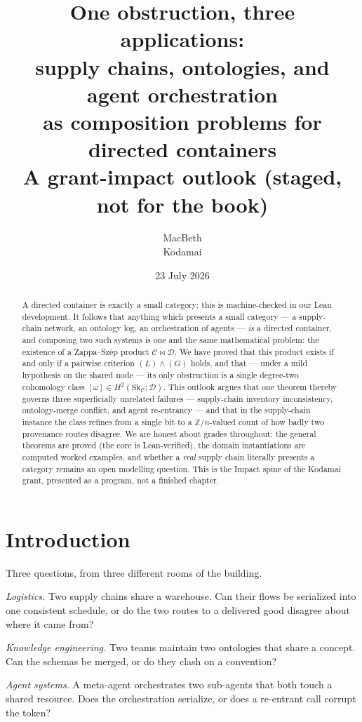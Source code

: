 \documentclass[11pt]{article}
\title{One obstruction, three applications:\\
supply chains, ontologies, and agent orchestration\\
as composition problems for directed containers\\[2pt]
\large A grant-impact outlook (staged, not for the book)}
\author{MacBeth\\\small Kodamai}
\date{23 July 2026}
\theoremstyle{definition}
\newcommand{\C}{\mathcal{C}}
\newcommand{\D}{\mathcal{D}}
\newcommand{\Sk}{\mathrm{Sk}}
\newcommand{\Zn}{\mathbb{Z}/n}
\begin{document}
\maketitle

\begin{abstract}
A directed container is exactly a small category; this is machine-checked in our Lean
development. It follows that anything which presents a small category --- a supply-chain
network, an ontology log, an orchestration of agents --- \emph{is} a directed container,
and composing two such systems is one and the same mathematical problem: the existence
of a Zappa--Sz\'ep product $\C\bowtie\D$. We have proved that this product exists if and
only if a pairwise criterion $(L)\wedge(G)$ holds, and that --- under a mild hypothesis on
the shared node --- its only obstruction is a single degree-two cohomology class
$[\omega]\in H^2(\Sk_\C;\D)$. This outlook argues that
one theorem thereby governs three superficially unrelated failures --- supply-chain
inventory inconsistency, ontology-merge conflict, and agent re-entrancy --- and that in
the supply-chain instance the class refines from a single bit to a $\Zn$-valued count of
how badly two provenance routes disagree. We are honest about grades throughout: the
general theorems are proved (the core is Lean-verified), the domain instantiations are
computed worked examples, and whether a \emph{real} supply chain literally presents a
category remains an open modelling question. This is the Impact spine of the Kodamai
grant, presented as a program, not a finished chapter.
\end{abstract}

\section{Introduction}\label{sec:intro}

Three questions, from three different rooms of the building.

\emph{Logistics.} Two supply chains share a warehouse. Can their flows be serialized into
one consistent schedule, or do the two routes to a delivered good disagree about where it
came from?

\emph{Knowledge engineering.} Two teams maintain two ontologies that share a concept.
Can the schemas be merged, or do they clash on a convention?

\emph{Agent systems.} A meta-agent orchestrates two sub-agents that both touch a shared
resource. Does the orchestration serialize, or does a re-entrant call corrupt the token?
\end{document}
